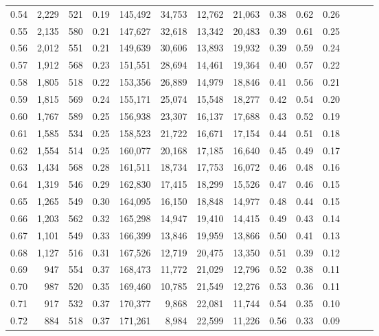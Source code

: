 \begin{tabular}{rrrrrrrrrrrrrr}
0.54 &  2,229 &  521 &  0.19 &  145,492 &   34,753 &  12,762 &  21,063 &  0.38 &  0.62 &      0.26 \\
0.55 &  2,135 &  580 &  0.21 &  147,627 &   32,618 &  13,342 &  20,483 &  0.39 &  0.61 &      0.25 \\
0.56 &  2,012 &  551 &  0.21 &  149,639 &   30,606 &  13,893 &  19,932 &  0.39 &  0.59 &      0.24 \\
0.57 &  1,912 &  568 &  0.23 &  151,551 &   28,694 &  14,461 &  19,364 &  0.40 &  0.57 &      0.22 \\
0.58 &  1,805 &  518 &  0.22 &  153,356 &   26,889 &  14,979 &  18,846 &  0.41 &  0.56 &      0.21 \\
0.59 &  1,815 &  569 &  0.24 &  155,171 &   25,074 &  15,548 &  18,277 &  0.42 &  0.54 &      0.20 \\
0.60 &  1,767 &  589 &  0.25 &  156,938 &   23,307 &  16,137 &  17,688 &  0.43 &  0.52 &      0.19 \\
0.61 &  1,585 &  534 &  0.25 &  158,523 &   21,722 &  16,671 &  17,154 &  0.44 &  0.51 &      0.18 \\
0.62 &  1,554 &  514 &  0.25 &  160,077 &   20,168 &  17,185 &  16,640 &  0.45 &  0.49 &      0.17 \\
0.63 &  1,434 &  568 &  0.28 &  161,511 &   18,734 &  17,753 &  16,072 &  0.46 &  0.48 &      0.16 \\
0.64 &  1,319 &  546 &  0.29 &  162,830 &   17,415 &  18,299 &  15,526 &  0.47 &  0.46 &      0.15 \\
0.65 &  1,265 &  549 &  0.30 &  164,095 &   16,150 &  18,848 &  14,977 &  0.48 &  0.44 &      0.15 \\
0.66 &  1,203 &  562 &  0.32 &  165,298 &   14,947 &  19,410 &  14,415 &  0.49 &  0.43 &      0.14 \\
0.67 &  1,101 &  549 &  0.33 &  166,399 &   13,846 &  19,959 &  13,866 &  0.50 &  0.41 &      0.13 \\
0.68 &  1,127 &  516 &  0.31 &  167,526 &   12,719 &  20,475 &  13,350 &  0.51 &  0.39 &      0.12 \\
0.69 &    947 &  554 &  0.37 &  168,473 &   11,772 &  21,029 &  12,796 &  0.52 &  0.38 &      0.11 \\
0.70 &    987 &  520 &  0.35 &  169,460 &   10,785 &  21,549 &  12,276 &  0.53 &  0.36 &      0.11 \\
0.71 &    917 &  532 &  0.37 &  170,377 &    9,868 &  22,081 &  11,744 &  0.54 &  0.35 &      0.10 \\
0.72 &    884 &  518 &  0.37 &  171,261 &    8,984 &  22,599 &  11,226 &  0.56 &  0.33 &      0.09 \\

\end{tabular}

